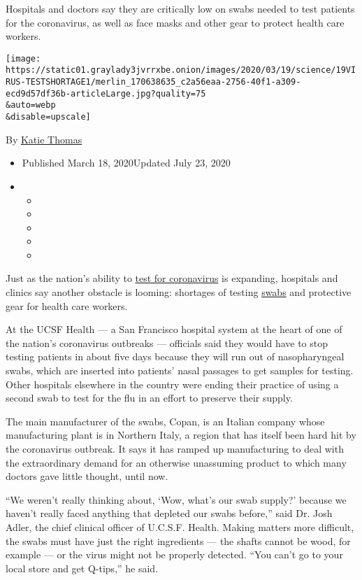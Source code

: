 Hospitals and doctors say they are critically low on swabs needed to
test patients for the coronavirus, as well as face masks and other gear
to protect health care workers.

\texttt{[image: https://static01.graylady3jvrrxbe.onion/images/2020/03/19/science/19VIRUS-TESTSHORTAGE1/merlin\_170638635\_c2a56eaa-2756-40f1-a309-ecd9d57df36b-articleLarge.jpg?quality=75\\\&auto=webp\\\&disable=upscale]}

By \href{https://www.nytimes3xbfgragh.onion/by/katie-thomas}{Katie
Thomas}

\begin{itemize}
\item
  Published March 18, 2020Updated July 23, 2020
\item
  \begin{itemize}
  \item
  \item
  \item
  \item
  \item
  \end{itemize}
\end{itemize}

Just as the nation's ability to
\href{https://www.nytimes3xbfgragh.onion/2020/07/23/health/coronavirus-testing-supply-shortage.html}{test
for coronavirus} is expanding, hospitals and clinics say another
obstacle is looming: shortages of testing
\href{https://www.nytimes3xbfgragh.onion/2020/04/13/nyregion/coronavirus-testing.html}{swabs}
and protective gear for health care workers.

At the UCSF Health --- a San Francisco hospital system at the heart of
one of the nation's coronavirus outbreaks --- officials said they would
have to stop testing patients in about five days because they will run
out of nasopharyngeal swabs, which are inserted into patients' nasal
passages to get samples for testing. Other hospitals elsewhere in the
country were ending their practice of using a second swab to test for
the flu in an effort to preserve their supply.

The main manufacturer of the swabs, Copan, is an Italian company whose
manufacturing plant is in Northern Italy, a region that has itself been
hard hit by the coronavirus outbreak. It says it has ramped up
manufacturing to deal with the extraordinary demand for an otherwise
unassuming product to which many doctors gave little thought, until now.

``We weren't really thinking about, `Wow, what's our swab supply?'
because we haven't really faced anything that depleted our swabs
before,'' said Dr. Josh Adler, the chief clinical officer of U.C.S.F.
Health. Making matters more difficult, the swabs must have just the
right ingredients --- the shafts cannot be wood, for example --- or the
virus might not be properly detected. ``You can't go to your local store
and get Q-tips,'' he said.

